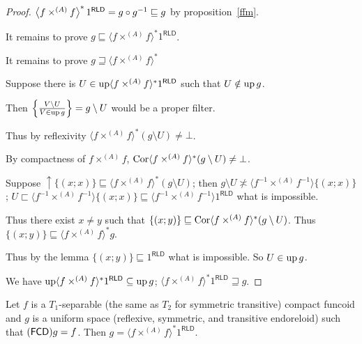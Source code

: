 \begin{proof}
$\left\langle  f \times^{(A)} f \right\rangle ^{\ast} 1^{\mathsf{RLD}} = g \circ g^{- 1} \sqsubseteq g$ by proposition~\ref{ffm}.

It remains to prove $g \sqsubseteq \langle f \times^{(A)} f \rangle^{\ast}
1^{\mathsf{RLD}}$. 


It remains to prove $g \sqsupseteq \langle f \times^{(A)} f \rangle^{\ast}$

Suppose there is $U \in \operatorname{up} \langle f \times^{(A)} f \rangle^{\ast} 1^{\mathsf{RLD}}$
such that $U \notin \operatorname{up} g$.

Then $\left\{ \frac{ V \setminus U }{ V \in \operatorname{up} g }\right\} = g \setminus U$ would be a proper filter.

Thus by reflexivity $\langle f \times^{(A)} f \rangle^{\ast} (g \setminus U) \neq
\bot$.

By compactness of $f \times^{(A)} f$, $\operatorname{Cor} \langle f \times^{(A)} f \rangle^{\ast}
(g \setminus U) \neq \bot$.

Suppose $\uparrow \{ (x ; x) \} \sqsubseteq \langle f \times^{(A)} f \rangle^{\ast}
(g \setminus U)$; then $g \setminus U \nasymp \langle f^{- 1} \times^{(A)} f^{- 1}
\rangle \{ (x ; x) \}$; $U \sqsubset \langle f^{- 1} \times^{(A)} f^{- 1} \rangle \{
(x ; x) \} \sqsubseteq \langle f^{- 1} \times^{(A)} f^{- 1} \rangle 1^{\mathsf{RLD}}$ what is
impossible.

Thus there exist $x \neq y$ such that $\{ (x ; y) \} \sqsubseteq \operatorname{Cor}
\langle f \times^{(A)} f \rangle^{\ast} (g \setminus U)$. Thus $\{ (x ; y) \}
\sqsubseteq \langle f \times^{(A)} f \rangle^{\ast} g$.

Thus by the lemma $\{ (x ; y) \} \sqsubseteq 1^{\mathsf{RLD}}$ what is impossible. So $U
\in \operatorname{up} g$.

We have $\operatorname{up} \langle f \times^{(A)} f \rangle^{\ast} 1^{\mathsf{RLD}} \subseteq
\operatorname{up} g$; $\langle f \times^{(A)} f \rangle^{\ast} 1^{\mathsf{RLD}} \sqsupseteq g$.
\end{proof}

\begin{cor}
  Let $f$ is a $T_1$-separable (the same as $T_2$ for symmetric transitive)
  compact funcoid and $g$ is a uniform space (reflexive, symmetric, and
  transitive endoreloid) such that $(\mathsf{FCD}) g = f$. Then $g =
  \langle f \times^{(A)} f \rangle^{\ast} 1^{\mathsf{RLD}}$.
\end{cor}

